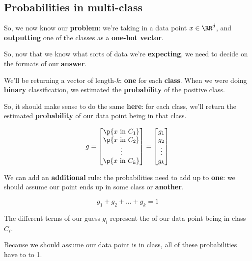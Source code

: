     \subsection*{Probabilities in multi-class}
    
        So, we now know our \textbf{problem}: we're taking in a data point $x \in \RR^d$, and \textbf{outputting} one of the classes as a \textbf{one-hot vector}.
        
        So, now that we know what sorts of data we're \textbf{expecting}, we need to decide on the formats of our \textbf{answer}.
        
        We'll be returning a vector of length-$k$: \textbf{one} for each \textbf{class}. When we were doing \textbf{binary} classification, we estimated the \textbf{probability} of the positive class.
        
        So, it should make sense to do the same \textbf{here}: for each class, we'll return the estimated \textbf{probability} of our data point being in that class.
        
        \begin{equation}
            g
            =
            \begin{bmatrix}
              \p{x \text{ in } C_1} \\ 
              \p{x \text{ in } C_2} \\ 
              \vdots \\ 
              \p{x \text{ in } C_k} 
            \end{bmatrix}
            =
            \begin{bmatrix}
              g_1\\g_2\\\vdots\\g_k
            \end{bmatrix}
        \end{equation}
        
        We can add an \textbf{additional} rule: the probabilities need to add up to \textbf{one}: we should assume our point ends up in some class or \textbf{another}.
        
        \begin{equation}
            g_1+g_2+...+g_k=1
        \end{equation}
        
        \begin{concept}
            The different terms of our  guess $g_i$ represent the  of our data point being in class $C_i$.
            
            Because we should assume our data point is in  class, all of these probabilities have to  to 1.
        \end{concept}
        
